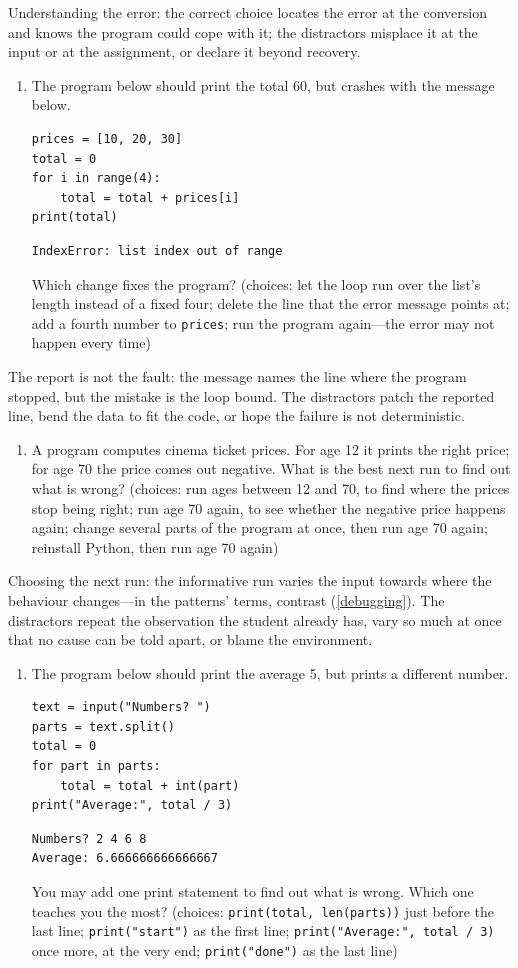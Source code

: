 Understanding the error: the correct choice locates the error at the
conversion and knows the program could cope with it; the distractors
misplace it at the input or at the assignment, or declare it beyond
recovery.
\begin{enumerate}[resume*=knowledgequiz]
  \item The program below should print the total 60, but crashes with
    the message below.
\begin{verbatim}
prices = [10, 20, 30]
total = 0
for i in range(4):
    total = total + prices[i]
print(total)
\end{verbatim}
\begin{verbatim}
IndexError: list index out of range
\end{verbatim}
    Which change fixes the program?
    (choices: let the loop run over the list's length instead of a
    fixed four; delete the line that the error message points at; add
    a fourth number to \texttt{prices}; run the program
    again---the error may not happen every time)
\end{enumerate}
The report is not the fault: the message names the line where the
program stopped, but the mistake is the loop bound.
The distractors patch the reported line, bend the data to fit the code,
or hope the failure is not deterministic.
\begin{enumerate}[resume*=knowledgequiz]
  \item A program computes cinema ticket prices.
    For age 12 it prints the right price; for age 70 the price comes
    out negative.
    What is the best next run to find out what is wrong?
    (choices: run ages between 12 and 70, to find where the prices stop
    being right; run age 70 again, to see whether the negative price
    happens again; change several parts of the program at once, then
    run age 70 again; reinstall Python, then run age 70 again)
\end{enumerate}
Choosing the next run: the informative run varies the input towards
where the behaviour changes---in the patterns' terms, contrast
(\cref{debugging}).
The distractors repeat the observation the student already has, vary so
much at once that no cause can be told apart, or blame the environment.
\begin{enumerate}[resume*=knowledgequiz]
  \item The program below should print the average 5, but prints a
    different number.
\begin{verbatim}
text = input("Numbers? ")
parts = text.split()
total = 0
for part in parts:
    total = total + int(part)
print("Average:", total / 3)
\end{verbatim}
\begin{verbatim}
Numbers? 2 4 6 8
Average: 6.666666666666667
\end{verbatim}
    You may add one print statement to find out what is wrong.
    Which one teaches you the most?
    (choices: \texttt{print(total, len(parts))} just before
    the last line; \texttt{print("start")} as the first
    line; \texttt{print("Average:", total / 3)} once more,
    at the very end; \texttt{print("done")} as the last
    line)
\end{enumerate}

